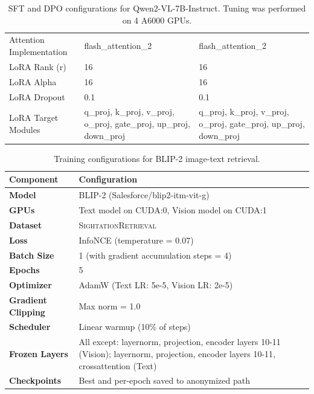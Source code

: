 \begin{table}[t]
\begin{tabularx}{\textwidth}{lXX}
Attention Implementation & flash\_attention\_2 & flash\_attention\_2 \\
LoRA Rank (r) & 16 & 16 \\
LoRA Alpha & 16 & 16 \\
LoRA Dropout & 0.1 & 0.1 \\
LoRA Target Modules & q\_proj, k\_proj, v\_proj, o\_proj, gate\_proj, up\_proj, down\_proj & q\_proj, k\_proj, v\_proj, o\_proj, gate\_proj, up\_proj, down\_proj \\
\bottomrule
\end{tabularx}
\caption{SFT and DPO configurations for Qwen2-VL-7B-Instruct. Tuning was performed on 4 \texttimes A6000 GPUs.
}
\label{tab:tuning_config_7b_sft_dpo}
\end{table}


\begin{table}[t]
\centering
\small
\begin{tabularx}{\textwidth}{lX}
\toprule
\textbf{Component} & \textbf{Configuration} \\ \midrule
\textbf{Model} & BLIP-2 (Salesforce/blip2-itm-vit-g) \\
\textbf{GPUs} & Text model on CUDA:0, Vision model on CUDA:1 \\
\textbf{Dataset} & \textsc{SightationRetrieval} \\
\textbf{Loss} & InfoNCE (temperature = 0.07) \\
\textbf{Batch Size} & 1 (with gradient accumulation steps = 4) \\
\textbf{Epochs} & 5 \\
\textbf{Optimizer} & AdamW (Text LR: 5e-5, Vision LR: 2e-5) \\
\textbf{Gradient Clipping} & Max norm = 1.0 \\
\textbf{Scheduler} & Linear warmup (10\% of steps) \\
\textbf{Frozen Layers} & All except: layernorm, projection, encoder layers 10-11 (Vision); layernorm, projection, encoder layers 10-11, crossattention (Text) \\
\textbf{Checkpoints} & Best and per-epoch saved to anonymized path \\
\bottomrule
\end{tabularx}
\caption{Training configurations for BLIP-2 image-text retrieval.}
\label{tab:retrieval_config}
\end{table}




